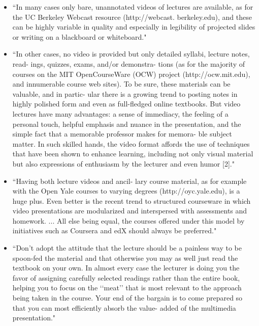 \documentclass[pdftex,english,11pt,parskip=half]{scrartcl}
\begin{document}
\begin{itemize}
\item ``In many cases only bare, unannotated videos of lectures are available, as for the UC Berkeley Webcast resource (http://webcast. berkeley.edu), and these can be highly variable in quality and especially in legibility of projected slides or writing on a blackboard or whiteboard." \cite{searls2012ten}
\item ``In other cases, no video is provided but only detailed syllabi, lecture notes, read- ings, quizzes, exams, and/or demonstra- tions (as for the majority of courses on the MIT OpenCourseWare (OCW) project (http://ocw.mit.edu), and innumerable course web sites). To be sure, these materials can be valuable, and in partic- ular there is a growing trend to posting notes in highly polished form and even as full-fledged online textbooks. But video lectures have many advantages: a sense of immediacy, the feeling of a personal touch, helpful emphasis and nuance in the presentation, and the simple fact that a memorable professor makes for memora- ble subject matter. In such skilled hands, the video format affords the use of techniques that have been shown to enhance learning, including not only visual material but also expressions of enthusiasm by the lecturer and even humor [2]." \cite{searls2012ten}
\item ``Having both lecture videos and ancil- lary course material, as for example with the Open Yale courses to varying degrees (http://oyc.yale.edu), is a huge plus. Even better is the recent trend to structured courseware in which video presentations are modularized and interspersed with assessments and homework. ... All else being equal, the courses offered under this model by initiatives such as Coursera and edX should always be preferred." \cite{searls2012ten}
\item ``Don’t adopt the attitude that the lecture should be a painless way to be spoon-fed the material and that otherwise you may as well just read the textbook on your own. In almost every case the lecturer is doing you the favor of assigning carefully selected readings rather than the entire book, helping you to focus on the ‘‘meat’’ that is most relevant to the approach being taken in the course. Your end of the bargain is to come prepared so that you can most efficiently absorb the value- added of the multimedia presentation." \cite{searls2012ten}

\end{itemize}
\end{document}
